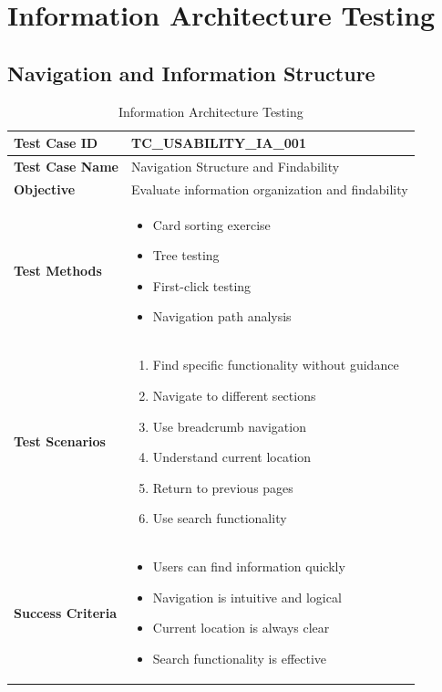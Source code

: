 \documentclass[12pt,a4paper]{article}
\begin{document}
\section{Information Architecture Testing}

\subsection{Navigation and Information Structure}

\begin{longtable}{|p{3cm}|p{12cm}|}
\caption{Information Architecture Testing} \\
\hline
\rowcolor{lightgray}
\textbf{Test Case ID} & \textbf{TC\_USABILITY\_IA\_001} \\
\hline
\textbf{Test Case Name} & Navigation Structure and Findability \\
\hline
\textbf{Objective} & Evaluate information organization and findability \\
\hline
\textbf{Test Methods} & 
\begin{itemize}[nosep]
    \item Card sorting exercise
    \item Tree testing
    \item First-click testing
    \item Navigation path analysis
\end{itemize} \\
\hline
\textbf{Test Scenarios} & 
\begin{enumerate}[nosep]
    \item Find specific functionality without guidance
    \item Navigate to different sections
    \item Use breadcrumb navigation
    \item Understand current location
    \item Return to previous pages
    \item Use search functionality
\end{enumerate} \\
\hline
\textbf{Success Criteria} & 
\begin{itemize}[nosep]
    \item Users can find information quickly
    \item Navigation is intuitive and logical
    \item Current location is always clear
    \item Search functionality is effective

\end{itemize}
\end{longtable}
\end{document}
